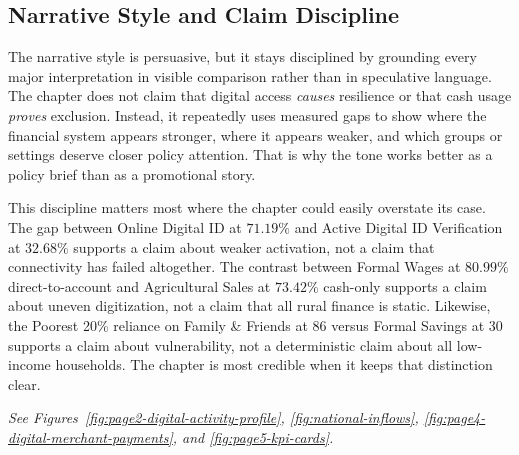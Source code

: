 \documentclass[../main.tex]{subfiles}
\begin{document}
\subsection{Narrative Style and Claim Discipline}
\label{subsec:narrative-style}

The narrative style is persuasive, but it stays disciplined by grounding every
major interpretation in visible comparison rather than in speculative language.
The chapter does not claim that digital access \emph{causes} resilience or that
cash usage \emph{proves} exclusion. Instead, it repeatedly uses measured gaps to
show where the financial system appears stronger, where it appears weaker, and
which groups or settings deserve closer policy attention. That is why the tone
works better as a policy brief than as a promotional story.

This discipline matters most where the chapter could easily overstate its case.
The gap between Online Digital ID at \(71.19\%\) and Active Digital ID
Verification at \(32.68\%\) supports a claim about weaker activation, not a
claim that connectivity has failed altogether. The contrast between Formal
Wages at \(80.99\%\) direct-to-account and Agricultural Sales at \(73.42\%\)
cash-only supports a claim about uneven digitization, not a claim that all
rural finance is static. Likewise, the Poorest 20\% reliance on Family \&
Friends at 86 versus Formal Savings at 30 supports a claim about vulnerability,
not a deterministic claim about all low-income households. The chapter is most
credible when it keeps that distinction clear.

\noindent\textit{See Figures~\ref{fig:page2-digital-activity-profile},
\ref{fig:national-inflows}, \ref{fig:page4-digital-merchant-payments}, and
\ref{fig:page5-kpi-cards}.}
\end{document}
